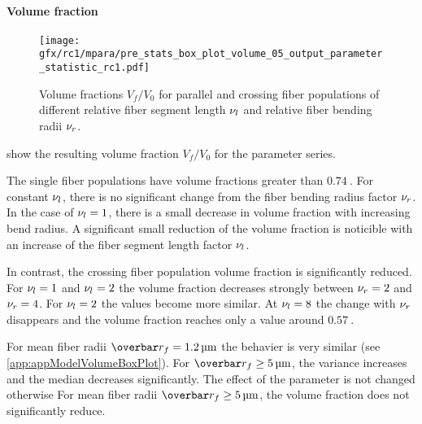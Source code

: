 \paragraph{Volume fraction}
%
\begin{figure}[t]
\centering
\texttt{[image: gfx/rc1/mpara/pre\_stats\_box\_plot\_volume\_05\_output\_parameter\_statistic\_rc1.pdf]}
\caption{Volume fractions $V_f/V_0$ for parallel \pfbs{} and crossing \cfbs{} fiber populations of different relative fiber segment length $\textnormal{$\nu_{l}$}$ and relative fiber bending radii $\textnormal{$\nu_{r}$}$.}
\label{fig:psbp1}
\end{figure}
 show the resulting volume fraction $V_f/V_0$ for the parameter series.
\par
%
The single fiber populations \pfbs{} have volume fractions greater than $\SI{0.74}{}$.
For constant $\textnormal{$\nu_{l}$}$, there is no significant change from the fiber bending radius factor $\textnormal{$\nu_{r}$}$.
In the case of $\textnormal{$\nu_{l}$} = \SI{1}{}$, there is a small decrease in volume fraction with increasing bend radius.
A significant small reduction of the volume fraction is noticible with an increase of the fiber segment length factor $\textnormal{$\nu_{l}$}$.
\par
%
In contrast, the crossing fiber population \cfbs{} volume fraction is significantly reduced.
For $\textnormal{$\nu_{l}$}=\SI{1}{}$ and $\textnormal{$\nu_{l}$}=\SI{2}{}$ the volume fraction decreases strongly between $\textnormal{$\nu_{r}$} = \SI{2}{}$ and $\textnormal{$\nu_{r}$} = \SI{4}{}$.
For $\textnormal{$\nu_{l}$}=\SI{2}{}$ the values become more similar.
At $\textnormal{$\nu_{l}$}=\SI{8}{}$ the change with $\textnormal{$\nu_{r}$}$ disappears and the volume fraction reaches only a value around $\SI{0.57}{}$.
\par
%
For mean fiber radii $\fiberRadiusMean = \SIlist{1,2}{\micro\meter}$ the behavier is very similar (see \cref{app:appModelVolumeBoxPlot}). For $\fiberRadiusMean \geq \SI{5}{\micro\meter}$, the variance increases and the median decreases significantly.
The effect of the parameter is not changed otherwise
For mean fiber radii $\fiberRadiusMean \geq \SI{5}{\micro\meter}$, the volume fraction does not significantly reduce.
% 
% 
% 
